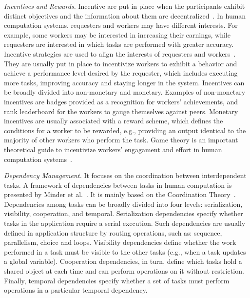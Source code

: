 \documentclass[11pt]{bmc_article_s50}
\begin{document}
\textit{Incentives and Rewards.} Incentive are put in place when the participants exhibit distinct objectives and the  information about them are decentralized~\cite{laffont2009theory}. In human computation systems, requesters and workers may have different interests. For example, some  workers may be interested in increasing their earnings, while requesters are interested in which tasks are performed with greater accuracy. Incentive strategies are used to align the interests of requesters and workers~\cite{Scekic:CommunACM:2013}. They are usually put in place to incentivize workers to exhibit a behavior and achieve a performance level desired by the requester, which includes executing more tasks, improving accuracy and staying longer in the system. Incentives can be broadly divided into non-monetary and monetary. Examples of non-monetary incentives are badges provided as a recognition for workers' achievements, and rank leaderboard for the workers to gauge themselves against peers. Monetary incentives are usually associated with a reward scheme, which defines the conditions for a worker to be rewarded, e.g., providing an output identical to the majority of other workers who perform the task. Game theory is an important theoretical guide to incentivize workers' engagament and effort in human computation systems~\cite{Arpita:2013,Jain:2009}.

\textit{Dependency Management.} It focuses on the coordination between interdependent tasks. A framework of dependencies between tasks in human computation is presented by Minder et al.~\cite{Minder2011}. It is mainly based on the Coordination Theory~\cite{Malone1994}. Dependencies among tasks can be broadly divided into four levels: serialization, visibility, cooperation, and temporal. Serialization dependencies specify whether tasks in the application require a serial execution. Such dependencies are usually defined in application structure by routing operations, such as: sequence, parallelism, choice and loops. Visibility dependencies define whether the work performed in a task must be visible to the other tasks (e.g., when a task updates a global variable). Cooperation dependencies, in turn, define which tasks hold a shared object at each time and can perform operations on it without restriction. Finally, temporal dependencies specify whether a set of tasks must perform operations in a particular temporal dependency.
\end{document}
